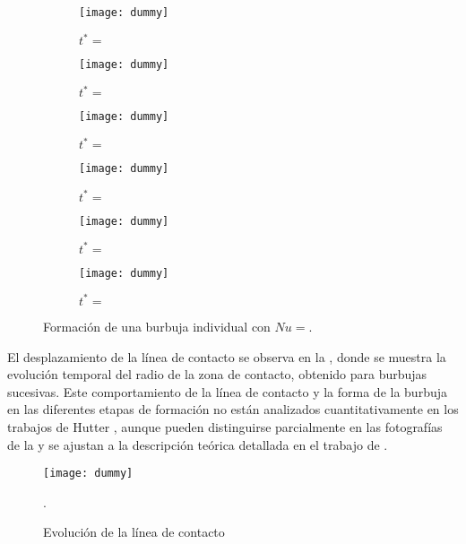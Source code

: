 \begin{figure}[htb]
    \centering
    \begin{subfigure}[t]{0.45\textwidth}
        \centering
        \texttt{[image: dummy]}
        \caption{$t^*=$}
    \end{subfigure}
    \begin{subfigure}[t]{0.45\textwidth}
        \centering
        \texttt{[image: dummy]}
        \caption{$t^*=$}
    \end{subfigure}
    \begin{subfigure}[t]{0.45\textwidth}
        \centering
        \texttt{[image: dummy]}
        \caption{$t^*=$}
    \end{subfigure}
    \begin{subfigure}[t]{0.45\textwidth}
        \centering
        \texttt{[image: dummy]}
        \caption{$t^*=$}
    \end{subfigure}
    \begin{subfigure}[t]{0.45\textwidth}
        \centering
        \texttt{[image: dummy]}
        \caption{$t^*=$}
    \end{subfigure}
    \begin{subfigure}[t]{0.45\textwidth}
        \centering
        \texttt{[image: dummy]}
        \caption{$t^*=$}
    \end{subfigure}            
    \caption{Formaci\'on de una burbuja individual con $Nu=$.}
    \label{fig:burbuja_nu_11}
\end{figure}
\FloatBarrier

El desplazamiento de la l\'inea de contacto se observa en la , donde se muestra la evoluci\'on temporal del radio de la zona de contacto, obtenido para burbujas sucesivas. Este comportamiento de la l\'inea de contacto y la forma de la burbuja en las diferentes etapas de formaci\'on no est\'an analizados cuantitativamente en los trabajos de Hutter \cite{hutter_experimental_2009, hutter_experimental_2010}, aunque pueden distinguirse parcialmente en las fotograf\'ias de la  y se ajustan a la descripci\'on te\'orica detallada en el trabajo de .

\begin{figure}[ht]
	\centering
	\texttt{[image: dummy]}
	\caption{Evoluci\'on de la l\'inea de contacto}.
	\label{fig:linea_contacto}
\end{figure}

